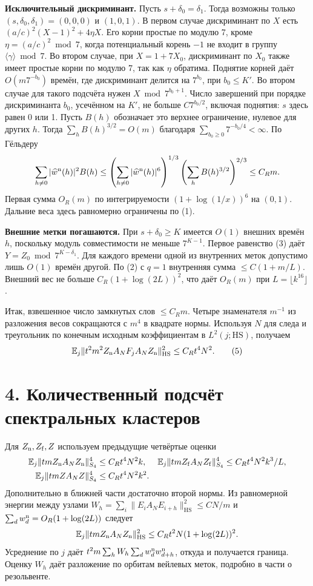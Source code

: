 \documentclass[11pt,a4paper]{article}
\newcommand{\EE}{\mathbb E}
\newcommand{\sect}[1]{\section*{\sffamily\color{ink}#1}}
\newcommand{\subt}[1]{\par\medskip\noindent\textbf{#1.}\quad}
\newcommand{\HS}{\mathrm{HS}}
\begin{document}
\subt{Исключительный дискриминант}
Пусть \(s+\delta_0=\delta_1\). Тогда возможны только \((s,\delta_0,\delta_1)=(0,0,0)\) и \((1,0,1)\). В первом случае дискриминант по \(X\) есть \((a/c)^2(X-1)^2+4\eta X\). Его корни простые по модулю 7, кроме \(\eta=(a/c)^2\bmod7\), когда потенциальный корень \(-1\) не входит в группу \(\langle\gamma\rangle\bmod7\). Во втором случае, при \(X=1+7X_0\), дискриминант по \(X_0\) также имеет простые корни по модулю 7, так как \(\eta\) обратима. Поднятие корней даёт \(O(m7^{-b_0})\) времён, где дискриминант делится на \(7^{b_0}\), при \(b_0\le K'\). Во втором случае для такого подсчёта нужен \(X\bmod7^{b_0+1}\). Число завершений при порядке дискриминанта \(b_0\), усечённом на \(K'\), не больше \(C7^{b_0/2}\), включая поднятия: \(s\) здесь равен 0 или 1. Пусть \(B(h)\) обозначает это верхнее ограничение, нулевое для других \(h\). Тогда \(\sum_h B(h)^{3/2}=O(m)\) благодаря \(\sum_{b_0\ge0}7^{-b_0/4}<\infty\). По Гёльдеру
\[
 \sum_{h\ne0} |\widehat w^{\rm n}(h)|^2 B(h)
 \le
 \left(\sum_{h\ne0}|\widehat w^{\rm n}(h)|^6\right)^{1/3}
 \left(\sum_h B(h)^{3/2}\right)^{2/3}
 \le C_R m .
\]
Первая сумма \(O_R(m)\) по интегрируемости \((1+\log(1/x))^6\) на \((0,1)\). Дальние веса здесь равномерно ограничены по (1).

\subt{Внешние метки погашаются}
При \(s+\delta_0\ge K\) имеется \(O(1)\) внешних времён \(h\), поскольку модуль совместимости не меньше \(7^{K-1}\). Первое равенство (3) даёт \(Y=Z_0\bmod7^{K-\delta_1}\). Для каждого времени одной из внутренних меток допустимо лишь \(O(1)\) времён другой. По (2) с \(q=1\) внутренняя сумма \(\le C(1+m/L)\). Внешний вес не больше \(C_R(1+\log(2L))^2\), что даёт \(O_R(m)\) при \(L=\lfloor k^{16}\rfloor\).

Итак, взвешенное число замкнутых слов \(\le C_R m\). Четыре знаменателя \(m^{-1}\) из разложения весов сокращаются с \(m^4\) в квадрате нормы. Используя \(N\) для следа и треугольник по конечным исходным коэффициентам в \(L^2(j;\mathrm{HS})\), получаем
\begin{equation}
       \EE_j\|t^2m^2 Z_{\rm n} A_N F_j A_N Z_{\rm n}\|_{\HS}^2
                             \le C_R t^4 N^2 .
                                                               \tag{5}
\end{equation}
\newpage
\sect{4. Количественный подсчёт спектральных кластеров}
Для \(Z_{\rm n},Z_{\rm f},Z\) используем предыдущие четвёртые оценки
\[
\begin{aligned}
 \EE_j\|tm Z_{\rm n}A_N Z_{\rm n}\|_{S_4}^4&\le C_Rt^4N^2k,&
 \EE_j\|tm Z_{\rm f}A_N Z_{\rm f}\|_{S_4}^4&\le C_Rt^4N^2 k^3/L,\\
 \EE_j\|tm Z A_N Z\|_{S_4}^4&\le C_R t^4N^2 k^2 .
\end{aligned}
\]
Дополнительно в ближней части достаточно второй нормы. Из равномерной энергии между узлами \(W_h=\sum_i\|E_i A_NE_{i+h}\|_{\HS}^2\le C N/m\) и \(\sum_d w^{\rm n}_d=O_R(1+\log(2L))\) следует
\[
        \EE_j\|tm Z_{\rm n} A_N Z_{\rm n}\|_{\HS}^2
                                    \le C_R t^2N(1+\log(2L))^2 .
\]
Усреднение по \(j\) даёт \(t^2m\sum_h W_h\sum_d w^{\rm n}_d w^{\rm n}_{d+h}\), откуда и получается граница. Оценку \(W_h\) даёт разложение по орбитам вейлевых меток, подробно в части о резольвенте.
\end{document}
